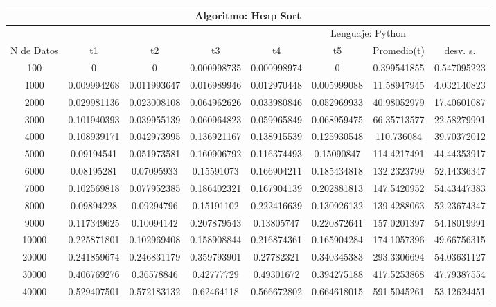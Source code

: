 \documentclass{article}
\begin{document}
    \begin{table}[]
        \begin{tabular}{|c|c|c|c|c|c|c|c| }
            \hline
            \multicolumn{8}{|c|}{Algoritmo: Heap Sort} \\ \hline
            \multicolumn{4}{|c|}{} & \multicolumn{4}{c|}{Lenguaje: Python} \\ \hline
              N de Datos &     t1    &  t2         &  t3          &   t4        &    t5     &   Promedio(t)       & desv. s. \\ \hline
    100	    &0	            &0	            &0.000998735	&0.000998974	&0	             &0.399541855	 &0.547095223\\ \hline
    1000	&0.009994268	&0.011993647	&0.016989946	&0.012970448	&0.005999088	&11.58947945	 	&4.032140823\\ \hline
    2000	&0.029981136	&0.023008108	&0.064962626	&0.033980846	&0.052969933	&40.98052979	 	&17.40601087\\ \hline
    3000	&0.101940393	&0.039955139	&0.060964823	&0.059965849	&0.068959475	&66.35713577	 	&22.58279991\\ \hline
    4000	&0.108939171	&0.042973995	&0.136921167	&0.138915539	&0.125930548	&110.736084	        &39.70372012\\ \hline
    5000	&0.09194541	    &0.051973581	&0.160906792	&0.116374493	&0.15090847	    &114.4217491	 	&44.44353917\\ \hline
    6000	&0.08195281	    &0.07095933	    &0.15591073	    &0.166904211	&0.185434818	&132.2323799	 	&52.14336347\\ \hline
    7000	&0.102569818	&0.077952385	&0.186402321	&0.167904139	&0.202881813	&147.5420952	 	&54.43447383\\ \hline
    8000	&0.09894228	    &0.09294796	    &0.15191102	    &0.222416639	&0.130926132	&139.4288063	 	&52.23674347\\ \hline
    9000	&0.117349625	&0.10094142	    &0.207879543	&0.13805747	    &0.220872641	&157.0201397	 	&54.18019991\\ \hline
    10000	&0.225871801	&0.102969408	&0.158908844	&0.216874361	&0.165904284	&174.1057396	 	&49.66756315\\ \hline
    20000	&0.241859674	&0.246831179	&0.359793901	&0.27782321	    &0.340345383	&293.3306694	 	&54.03631127\\ \hline
    30000	&0.406769276	&0.36578846	    &0.42777729	    &0.49301672	    &0.394275188	&417.5253868	 	&47.79387554\\ \hline
    40000	&0.529407501	&0.572183132	&0.62464118	    &0.566672802	&0.664618015	&591.5045261	 	&53.12624451\\ \hline

\end{tabular}
\end{table}
\end{document}
